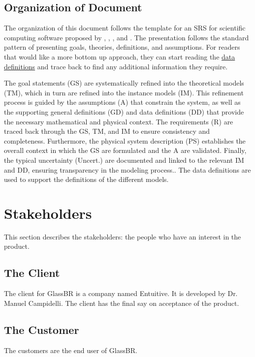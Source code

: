 \documentclass[12pt]{article}
\begin{document}
\subsection{Organization of Document}
\label{Sec:DocOrg}
The organization of this document follows the template for an SRS for scientific computing software proposed by \cite{koothoor2013}, \cite{smithLai2005}, \cite{smithEtAl2007}, and \cite{smithKoothoor2016}. The presentation follows the standard pattern of presenting goals, theories, definitions, and assumptions. For readers that would like a more bottom up approach, they can start reading the \hyperref[Sec:IMs]{data definitions} and trace back to find any additional information they require.

The goal statements (GS) are systematically refined into the theoretical models (TM), which in turn are refined into the instance models (IM). This refinement process is guided by the assumptions (A) that constrain the system, as well as the supporting general definitions (GD) and data definitions (DD) that provide the necessary mathematical and physical context. The requirements (R) are traced back through the GS, TM, and IM to ensure consistency and completeness. Furthermore, the physical system description (PS) establishes the overall context in which the GS are formulated and the A are validated. Finally, the typical uncertainty (Uncert.) are documented and linked to the relevant IM and DD, ensuring transparency in the modeling process.. The data definitions are used to support the definitions of the different models.

\section{Stakeholders}
\label{Sec:Stakeholder}
This section describes the stakeholders: the people who have an interest in the product.

\subsection{The Client}
\label{Sec:Client}
The client for GlassBR is a company named Entuitive. It is developed by Dr. Manuel Campidelli. The client has the final say on acceptance of the product.

\subsection{The Customer}
\label{Sec:Customer}
The customers are the end user of GlassBR.
\end{document}
